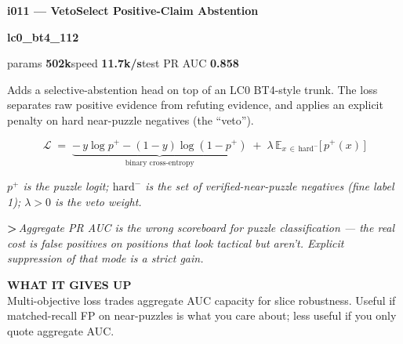 \documentclass[10pt,a4paper]{article}
\newcommand{\pilllc}[0]{\colorbox{lc0bluebg}{\strut\textcolor{lc0blue}{\scriptsize\bfseries\sffamily lc0\_bt4\_112}}}
\begin{document}
\begin{tcolorbox}
\begin{tcolorbox}[archhead, boxsep=0pt, top=4pt, bottom=4pt]
\textcolor{deepforest}{\sffamily\bfseries\large i011 --- VetoSelect Positive-Claim Abstention}\\[2pt]
\textcolor{muted}{\sffamily\scriptsize \pilllc{}\quad params \textbf{502k}\quad speed \textbf{11.7k/s}\quad test PR AUC \textbf{0.858}}
\end{tcolorbox}
\smallskip
Adds a selective-abstention head on top of an LC0 BT4-style trunk. The loss separates raw positive evidence from refuting evidence, and applies an explicit penalty on hard near-puzzle negatives (the ``veto'').
\par\smallskip
\begin{equation*}
\mathcal{L} \;=\; \underbrace{-\,y\log p^+ - (1-y)\log(1-p^+)}_{\text{binary cross-entropy}} \;+\; \lambda\,\mathbb{E}_{x\,\in\,\mathrm{hard}^-}\!\bigl[\,p^+(x)\,\bigr]
\end{equation*}
\par\vspace{-4pt}\begin{center}\textit{\textcolor{muted}{\small $p^+$ is the puzzle logit; $\mathrm{hard}^-$ is the set of verified-near-puzzle negatives (fine label 1); $\lambda > 0$ is the veto weight.}}\end{center}
\par\smallskip
{\color{forest}\sffamily\bfseries\textgreater\,}\textit{Aggregate PR AUC is the wrong scoreboard for puzzle classification --- the real cost is false positives on positions that \textit{look} tactical but aren't. Explicit suppression of that mode is a strict gain.}
\par\smallskip\textbf{\sffamily\footnotesize\color{muted}WHAT IT GIVES UP}\\
Multi-objective loss trades aggregate AUC capacity for slice robustness. Useful if matched-recall FP on near-puzzles is what you care about; less useful if you only quote aggregate AUC.
\end{tcolorbox}
\end{document}
